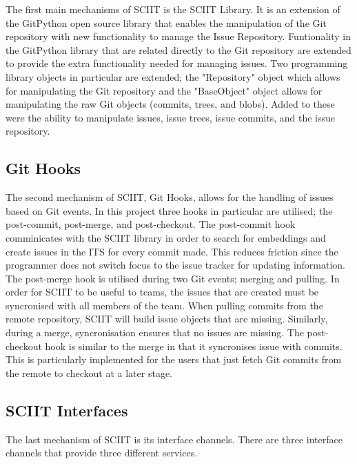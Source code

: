 \documentclass{mproj}
\begin{document}
The first main mechanisms of SCIIT is the SCIIT Library. It is an extension of the GitPython open source library that enables the manipulation of the Git repository with new functionality to manage the Issue Repository. Funtionality in the GitPython library that are related directly to the Git repository are extended to provide the extra functionality needed for managing issues. Two programming library objects in particular are extended; the "Repository" object which allows for manipulating the Git repository and the "BaseObject" object allows for manipulating the raw Git objects (commits, trees, and blobs). Added to these were the ability to manipulate issues, issue trees, issue commits, and the issue repository.


\subsection{Git Hooks}

The second mechanism of SCIIT, Git Hooks, allows for the handling of issues based on Git events. In this project three hooks in particular are utilised; the post-commit, post-merge, and post-checkout. The post-commit hook comminicates with the SCIIT library in order to search for embeddings and create issues in the ITS for every commit made. This reduces friction since the programmer does not switch focus to the issue tracker for updating information. The post-merge hook is utilised during two Git events; merging and pulling. In order for SCIIT to be useful to teams, the issues that are created must be syncronised with all members of the team. When pulling commits from the remote repository, SCIIT will build issue objects that are missing. Similarly, during a merge, syncronisation ensures that no issues are missing. The post-checkout hook is similar to the merge in that it syncronises issue with commits. This is particularly implemented for the users that just fetch Git commits from the remote to checkout at a later stage.

\subsection{SCIIT Interfaces}

The last mechanism of SCIIT is its interface channels. There are three interface channels that provide three different services. 
\end{document}
